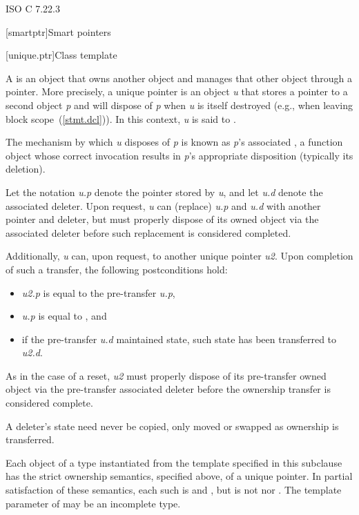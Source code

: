 \xref ISO C 7.22.3

[smartptr]{Smart pointers}

[unique.ptr]{Class template }

\pnum
A  is an object that owns another object and
manages that other object through a pointer. More precisely, a unique pointer
is an object \textit{u} that stores a pointer to a second object \textit{p} and
will dispose of \textit{p} when \textit{u} is itself destroyed (e.g., when
leaving block scope~(\ref{stmt.dcl})). In this context, \textit{u} is said
to  .

\pnum
The mechanism by which \textit{u} disposes of \textit{p} is known as
\textit{p}'s associated , a function object whose correct
invocation results in \textit{p}'s appropriate disposition (typically its deletion).

\pnum
Let the notation \textit{u.p} denote the pointer stored by \textit{u}, and
let \textit{u.d} denote the associated deleter. Upon request, \textit{u} can
 (replace) \textit{u.p} and \textit{u.d} with another pointer and
deleter, but must properly dispose of its owned object via the associated
deleter before such replacement is considered completed.

\pnum
Additionally, \textit{u} can, upon request,  to another
unique pointer \textit{u2}. Upon completion of such a transfer, the following
postconditions hold:

\begin{itemize}
\item \textit{u2.p} is equal to the pre-transfer \textit{u.p},
\item \textit{u.p} is equal to , and
\item if the pre-transfer \textit{u.d} maintained state, such state has been
transferred to \textit{u2.d}.
\end{itemize}

As in the case of a reset, \textit{u2} must properly dispose of its pre-transfer
owned object via the pre-transfer associated deleter before the ownership
transfer is considered complete. \begin{note} A deleter's state need never be
copied, only moved or swapped as ownership is transferred. \end{note}

\pnum
Each object of a type  instantiated from the  template
specified in this subclause has the strict ownership semantics, specified above,
of a unique pointer. In partial satisfaction of these semantics, each such 
is  and , but is not
 nor .
The template parameter  of  may be an incomplete type.

